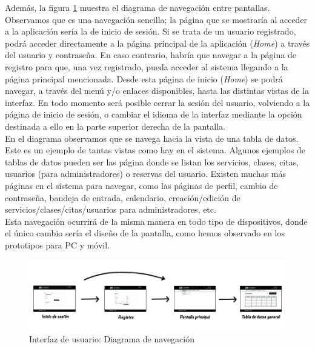 Además, la figura \ref{fig:interfaz-navegacion} muestra el diagrama de navegación entre pantallas. Observamos que es una navegación sencilla; la página que se mostraría al acceder a la aplicación sería la de inicio de sesión. Si se trata de un usuario registrado, podrá acceder directamente a la página principal de la aplicación (\textit{Home}) a través del usuario y contraseña. En caso contrario, habría que navegar a la página de registro para que, una vez registrado, pueda acceder al sistema llegando a la página principal mencionada. Desde esta página de inicio (\textit{Home}) se podrá navegar, a través del menú y/o enlaces disponibles, hasta las distintas vistas de la interfaz. En todo momento será posible cerrar la sesión del usuario, volviendo a la página de inicio de sesión, o cambiar el idioma de la interfaz mediante la opción destinada a ello en la parte superior derecha de la pantalla. \\ 

En el diagrama observamos que se navega hacia la vista de una tabla de datos. Este es un ejemplo de tantas vistas como hay en el sistema. Algunos ejemplos de tablas de datos pueden ser las página donde se listan los servicios, clases, citas, usuarios (para administradores) o reservas del usuario. Existen muchas más páginas en el sistema para navegar, como las páginas de perfil, cambio de contraseña, bandeja de entrada, calendario, creación/edición de servicios/clases/citas/usuarios para administradores, etc. \\

Esta navegación ocurrirá de la misma manera en todo tipo de dispositivos, donde el único cambio sería el diseño de la pantalla, como hemos observado en los prototipos para PC y móvil.


\begin{figure}[H]
\centering
  \includegraphics[scale=.50]{img/interfaz/navegacion.jpg}
  \caption{Interfaz de usuario: Diagrama de navegación}
  \label{fig:interfaz-navegacion}
\end{figure}

